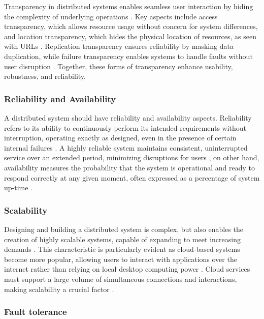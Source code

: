 Transparency in distributed systems enables seamless user interaction by hiding the complexity of underlying operations \cite{Tanenbaum2023, Ledmi2018}. Key aspects include access transparency, which allows resource usage without concern for system differences, and location transparency, which hides the physical location of resources, as seen with \glspl{URL} \cite{Tanenbaum2023, Coulouris2012}. Replication transparency ensures reliability by masking data duplication, while failure transparency enables systems to handle faults without user disruption \cite{Tanenbaum2023, Coulouris2012}. Together, these forms of transparency enhance usability, robustness, and reliability.

\subsubsection{Reliability and Availability}

A distributed system should have reliability and availability aspects. Reliability refers to its ability to continuously perform its intended requirements without interruption, operating exactly as designed, even in the presence of certain internal failures \cite{Ahmed2013}. A highly reliable system maintains consistent, uninterrupted service over an extended period, minimizing disruptions for users \cite{Tanenbaum2023}, on other hand, availability measures the probability that the system is operational and ready to respond correctly at any given moment, often expressed as a percentage of system up-time \cite{Tanenbaum2023, atlassian-availability}.

\subsubsection{Scalability}

Designing and building a distributed system is complex, but also enables the creation of highly scalable systems, capable of expanding to meet increasing demands \cite{Tanenbaum2023, Vitillo2021, Valkov2018}. This characteristic is particularly evident as cloud-based systems become more popular, allowing users to interact with applications over the internet rather than relying on local desktop computing power \cite{Lindsay2021}. Cloud services must support a large volume of simultaneous connections and interactions, making scalability a crucial factor \cite{Tanenbaum2023}.

\subsubsection{Fault tolerance}

